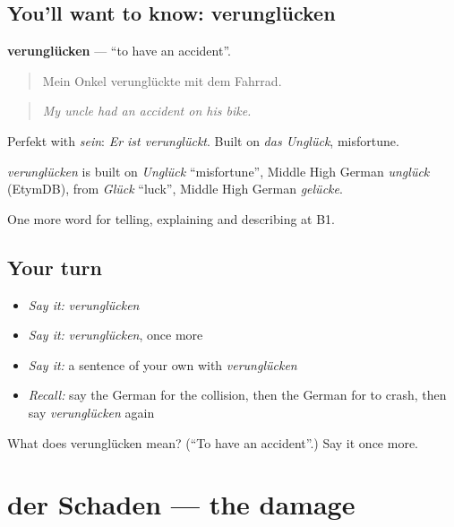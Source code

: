 \subsection*{You'll want to know: verunglücken}
\textbf{verunglücken} — \textquotedblleft{}to have an accident\textquotedblright{}.

\begin{quote}
Mein Onkel verunglückte mit dem Fahrrad.
\end{quote}

\begin{quote}
\emph{My uncle had an accident on his bike.}
\end{quote}

Perfekt with \emph{sein}: \emph{Er ist verunglückt}. Built on \emph{das Unglück}, misfortune.

\begin{cousinweb}
\emph{verunglücken} is built on \emph{Unglück} \textquotedblleft{}misfortune\textquotedblright{}, Middle High German \emph{unglück} (EtymDB), from \emph{Glück} \textquotedblleft{}luck\textquotedblright{}, Middle High German \emph{gelücke}.
\end{cousinweb}

\begin{grammarlens}[title={What you've built}]
One more word for telling, explaining and describing at B1.
\end{grammarlens}

\subsection*{Your turn}
\begin{itemize}
\raggedright
  \item \emph{Say it:} \emph{verunglücken}
  \item \emph{Say it:} \emph{verunglücken}, once more
  \item \emph{Say it:} a sentence of your own with \emph{verunglücken}
  \item \emph{Recall:} say the German for the collision, then the German for to crash, then say \emph{verunglücken} again
\end{itemize}

\begin{tcolorbox}[breakable,colback=teal!4,colframe=teal!35!black,title={Before you move on}]
What does verunglücken mean? (\textquotedblleft{}To have an accident\textquotedblright{}.) Say it once more.
\end{tcolorbox}
\section[der Schaden]{der Schaden — the damage}

